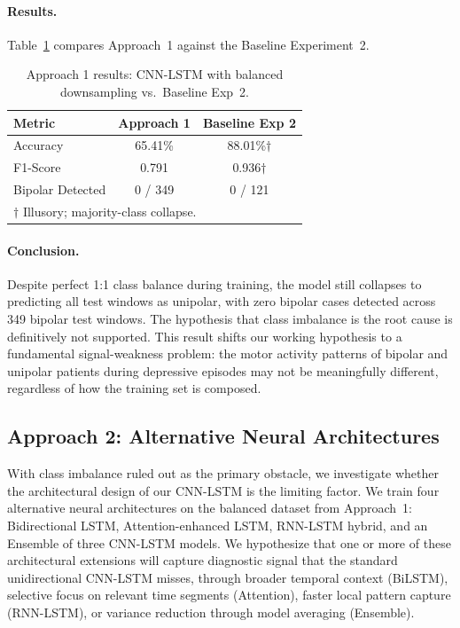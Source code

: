 \paragraph{Results.}
Table~\ref{tab:approach1_results} compares Approach~1 against the Baseline Experiment~2.

\begin{table}[H]
\centering
\caption{Approach 1 results: CNN-LSTM with balanced downsampling vs.\ Baseline Exp~2.}
\label{tab:approach1_results}
\begin{tabular}{lcc}
\toprule
\textbf{Metric} & \textbf{Approach 1} & \textbf{Baseline Exp 2} \\
\midrule
Accuracy & 65.41\% & 88.01\%$\dagger$ \\
F1-Score & 0.791 & 0.936$\dagger$ \\
Bipolar Detected & 0 / 349 & 0 / 121 \\
\bottomrule
\multicolumn{3}{l}{\footnotesize $\dagger$ Illusory; majority-class collapse.}
\end{tabular}
\end{table}


\paragraph{Conclusion.}
Despite perfect 1:1 class balance during training, the model still collapses to predicting all test windows as unipolar, with zero bipolar cases detected across 349 bipolar test windows. The hypothesis that class imbalance is the root cause is definitively not supported. This result shifts our working hypothesis to a fundamental signal-weakness problem: the motor activity patterns of bipolar and unipolar patients during depressive episodes may not be meaningfully different, regardless of how the training set is composed.

\subsection{Approach 2: Alternative Neural Architectures}

With class imbalance ruled out as the primary obstacle, we investigate whether the architectural design of our CNN-LSTM is the limiting factor. We train four alternative neural architectures on the balanced dataset from Approach~1: Bidirectional LSTM, Attention-enhanced LSTM, RNN-LSTM hybrid, and an Ensemble of three CNN-LSTM models. We hypothesize that one or more of these architectural extensions will capture diagnostic signal that the standard unidirectional CNN-LSTM misses, through broader temporal context (BiLSTM), selective focus on relevant time segments (Attention), faster local pattern capture (RNN-LSTM), or variance reduction through model averaging (Ensemble).

